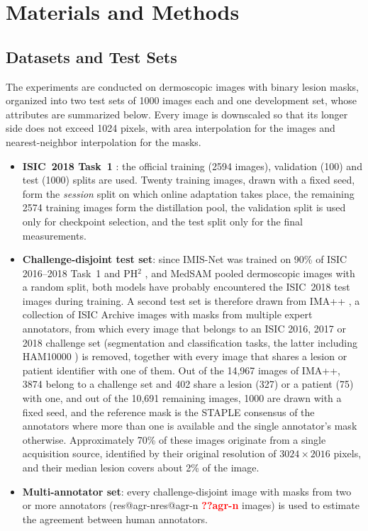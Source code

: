 \documentclass[runningheads]{llncs}
\makeatletter
\newcommand{\res}[1]{\ifcsname res@#1\endcsname\csname res@#1\endcsname
  \else\textbf{\textcolor{red}{??#1}}\fi}
\makeatother
\begin{document}
\section{Materials and Methods}\label{sec:methods}

\subsection{Datasets and Test Sets}

The experiments are conducted on dermoscopic images with binary lesion masks, organized into two test sets of 1000 images each and one development set, whose attributes are summarized below. Every image is downscaled so that its longer side does not exceed 1024 pixels, with area interpolation for the images and nearest-neighbor interpolation for the masks.
\begin{itemize}
\item \textbf{ISIC~2018 Task~1} \cite{codella2019isic}: the official training (2594 images), validation (100) and test (1000) splits are used. Twenty training images, drawn with a fixed seed, form the \emph{session} split on which online adaptation takes place, the remaining 2574 training images form the distillation pool, the validation split is used only for checkpoint selection, and the test split only for the final measurements.
\item \textbf{Challenge-disjoint test set}: since IMIS-Net was trained on 90\% of ISIC 2016--2018 Task~1 and PH$^2$ \cite{mendonca2013ph2}, and MedSAM pooled dermoscopic images with a random split, both models have probably encountered the ISIC~2018 test images during training. A second test set is therefore drawn from IMA++ \cite{abhishek2024imapp}, a collection of ISIC Archive images with masks from multiple expert annotators, from which every image that belongs to an ISIC 2016, 2017 or 2018 challenge set (segmentation and classification tasks, the latter including HAM10000 \cite{tschandl2018ham}) is removed, together with every image that shares a lesion or patient identifier with one of them. Out of the 14{,}967 images of IMA++, 3874 belong to a challenge set and 402 share a lesion (327) or a patient (75) with one, and out of the 10{,}691 remaining images, 1000 are drawn with a fixed seed, and the reference mask is the STAPLE consensus \cite{warfield2004staple} of the annotators where more than one is available and the single annotator's mask otherwise. Approximately 70\% of these images originate from a single acquisition source, identified by their original resolution of $3024\times2016$ pixels, and their median lesion covers about 2\% of the image.
\item \textbf{Multi-annotator set}: every challenge-disjoint image with masks from two or more annotators (\res{agr-n} images) is used to estimate the agreement between human annotators.
\end{itemize}
\end{document}
